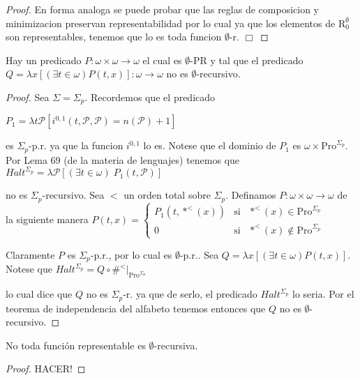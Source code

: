 \begin{proof}
    En forma analoga se puede probar que las reglas de composicion y minimizacion preservan representabilidad por lo cual ya que los elementos de $\mathrm{R}_{0}^{\emptyset }$ son representables, tenemos que lo es toda funcion $\emptyset $-r. $\Box$
  \end{proof}

  \begin{lemma} \label{lemma_116}
    \PN Hay un predicado $P: \omega \times \omega \rightarrow \omega$ el cual es $\emptyset$-PR y tal que el predicado
    $Q = \lambda x\left[(\exists t \in \omega) P(t, x)\right]: \omega \rightarrow \omega$ no es $\emptyset$-recursivo.
  \end{lemma}
  \begin{proof}
    Sea $\Sigma =\Sigma _{p}$. Recordemos que el predicado

    $\displaystyle P_{1}=\lambda t\mathcal{P}\left[ i^{0,1}(t,\mathcal{P},\mathcal{P})=n( \mathcal{P})+1\right] $

    es $\Sigma _{p}$-p.r. ya que la funcion $i^{0,1}$ lo es. Notese que el dominio de $P_{1}$ es $\omega \times \mathrm{Pro}^{\Sigma _{p}}$. Por Lema 69 (de la materia de lenguajes) tenemos que
    $\displaystyle Halt^{\Sigma _{p}}=\lambda \mathcal{P}\left[ (\exists t\in \omega )\;P_{1}(t, \mathcal{P})\right] $

    no es $\Sigma _{p}$-recursivo. Sea $< $ un orden total sobre $\Sigma _{p}$. Definamos $P:\omega \times \omega \rightarrow \omega $ de la siguiente manera
    $\displaystyle P(t,x)=\left\{ \begin{array}{ccc} P_{1}(t,\ast ^{< }(x)) & \text{si} & \ast ^{< }(x)\in \mathrm{Pro}^{\Sigma _{p}} \\ 0 & \text{si} & \ast ^{< }(x)\notin \mathrm{Pro}^{\Sigma _{p}} \end{array} \right. $

    Claramente $P$ es $\Sigma _{p}$-p.r., por lo cual es $\emptyset $-p.r.. Sea $ Q=\lambda x\left[ (\exists t\in \omega )P(t,x)\right] .$ Notese que
    $\displaystyle Halt^{\Sigma _{p}}=Q\circ \#^{< }\mathrm{\mid }_{\mathrm{Pro}^{\Sigma _{p}}} $

    lo cual dice que $Q$ no es $\Sigma _{p}$-r. ya que de serlo, el predicado $ Halt^{\Sigma _{p}}$ lo seria. Por el teorema de independencia del alfabeto tenemos entonces que $Q$ no es $\emptyset $-recursivo.
  \end{proof}

  \begin{lemma} \label{lemma_117}
    \PN No toda función representable es $\emptyset$-recursiva.
  \end{lemma}
  \begin{proof}
    HACER!
  \end{proof}

